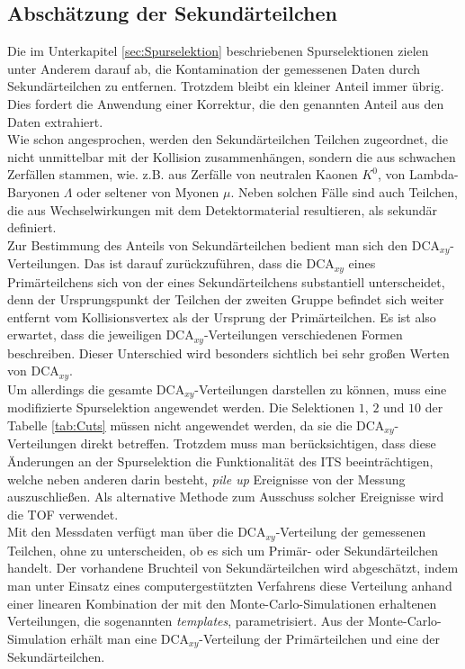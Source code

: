\subsection{Abschätzung der Sekundärteilchen}

Die im Unterkapitel \ref{sec:Spurselektion} beschriebenen Spurselektionen zielen unter Anderem darauf ab, die Kontamination der gemessenen Daten durch Sekundärteilchen zu entfernen. Trotzdem bleibt ein kleiner Anteil immer übrig. Dies fordert die Anwendung einer Korrektur, die den genannten Anteil aus den Daten extrahiert.\\
Wie schon angesprochen, werden den Sekundärteilchen Teilchen zugeordnet, die nicht unmittelbar mit der Kollision zusammenhängen, sondern die aus schwachen Zerfällen stammen, wie. z.B. aus Zerfälle von neutralen Kaonen $K^{0}$, von Lambda-Baryonen $\Lambda$ oder seltener von Myonen $\mu$. Neben solchen Fälle sind auch Teilchen, die aus Wechselwirkungen mit dem Detektormaterial resultieren, als sekundär definiert.\\
Zur Bestimmung des Anteils von Sekundärteilchen bedient man sich den $\mathrm{DCA}_{xy}$-Verteilungen. Das ist darauf zurückzuführen, dass die $\mathrm{DCA}_{xy}$ eines Primärteilchens sich von der eines Sekundärteilchens substantiell unterscheidet, denn der Ursprungspunkt der Teilchen der zweiten Gruppe befindet sich weiter entfernt vom Kollisionsvertex als der Ursprung der Primärteilchen. Es ist also erwartet, dass die jeweiligen $\mathrm{DCA}_{xy}$-Verteilungen verschiedenen Formen beschreiben. Dieser Unterschied wird besonders sichtlich bei sehr großen Werten von $\mathrm{DCA}_{xy}$.\\
Um allerdings die gesamte $\mathrm{DCA}_{xy}$-Verteilungen darstellen zu können, muss eine modifizierte Spurselektion angewendet werden. Die Selektionen $1$, $2$ und $10$ der Tabelle \ref{tab:Cuts} müssen nicht angewendet werden, da sie die $\mathrm{DCA}_{xy}$-Verteilungen direkt betreffen. Trotzdem muss man berücksichtigen, dass diese Änderungen an der Spurselektion die Funktionalität des ITS beeinträchtigen, welche neben anderen darin besteht, \textit{pile up} Ereignisse von der Messung auszuschließen. Als alternative Methode zum Ausschuss solcher Ereignisse wird die TOF verwendet.\\
Mit den Messdaten verfügt man über die $\mathrm{DCA}_{xy}$-Verteilung der gemessenen Teilchen, ohne zu unterscheiden, ob es sich um Primär- oder Sekundärteilchen handelt. Der vorhandene Bruchteil von Sekundärteilchen wird abgeschätzt, indem man unter Einsatz eines computergestützten Verfahrens diese Verteilung anhand einer linearen Kombination der mit den Monte-Carlo-Simulationen erhaltenen Verteilungen, die sogenannten \textit{templates}, parametrisiert. Aus der Monte-Carlo-Simulation erhält man eine $\mathrm{DCA}_{xy}$-Verteilung der Primärteilchen und eine der Sekundärteilchen.\\
